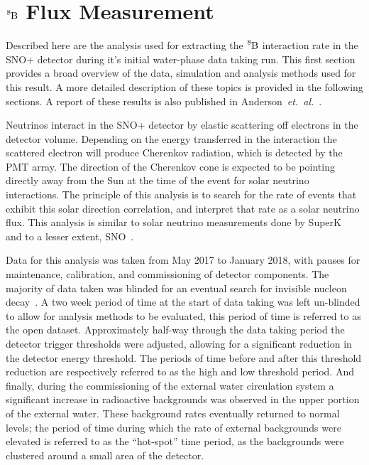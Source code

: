 \chapter{$\ce{^{8}B}$ Flux Measurement}
\label{sec:sigex}

\ifpdf
    \graphicspath{{sigex/figures/PNG/}{sigex/figures/PDF/}{sigex/figures/}}
\else
    \graphicspath{{sigex/figures/EPS/}{sigex/figures/}}
\fi


 Described here are the analysis used for extracting the $\ce{^{8}B}$
interaction rate in the SNO+ detector during it's initial water-phase
data taking run.
This first section provides a broad overview of the data, simulation and analysis methods
used for this result.
A more detailed description of these topics is provided in the following sections.
A report of these results is also published in Anderson~\textit{et.\ al.}~\cite{snop_solar}.

Neutrinos interact in the SNO+ detector by elastic scattering off
electrons in the detector volume.
Depending on the energy transferred in the interaction
the scattered electron will produce Cherenkov radiation, which is detected by the PMT array.
The direction of the Cherenkov cone is expected to be pointing directly away
from the Sun at the time of the event for solar neutrino interactions.
The principle of this analysis is to search for the rate of events that exhibit
this solar direction correlation, and interpret that rate as a solar neutrino flux.
This analysis is similar to solar neutrino measurements done by SuperK~\cite{superk4} and
to a lesser extent, SNO~\cite{sno_combined}.

Data for this analysis was taken from May 2017 to January 2018, with pauses
for maintenance, calibration, and commissioning of detector components.
The majority of data taken was blinded for an eventual search for invisible
nucleon decay~\cite{snop_nd}.
A two week period of time at the start of data taking was left un-blinded to
allow for analysis methods to be evaluated, this period of time is referred
to as the open dataset.
Approximately half-way through the data taking period the detector trigger thresholds
were adjusted, allowing for a significant reduction in the detector energy
threshold.
The periods of time before and after this threshold reduction are respectively
referred to as the high and low threshold period.
And finally, during the commissioning of the external water circulation system
a significant increase in radioactive backgrounds was observed in the upper
portion of the external water.
These background rates eventually returned to normal levels; the period of time
during which the rate of external backgrounds were elevated is referred to
as the ``hot-spot'' time period, as the backgrounds were clustered around
a small area of the detector.

